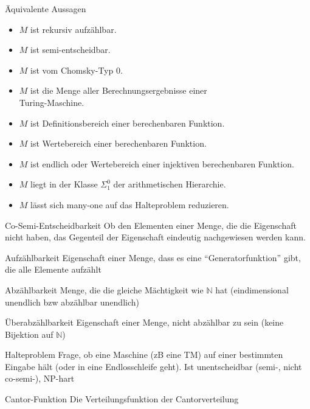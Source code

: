 \documentclass[a7paper,print,grid=both]{kartei}
\begin{document}
\begin{karte}{Äquivalente Aussagen}
\begin{itemize}
    \setlength{\itemindent}{-0.5cm}
    \setlength{\itemsep}{-0.1cm}
    \item $M$ ist rekursiv aufzählbar.
    \item $M$ ist semi-entscheidbar.
    \item $M$ ist vom Chomsky-Typ 0.
    \item $M$ ist die Menge aller Berechnungsergebnisse einer \\Turing-Maschine.
    \item $M$ ist Definitionsbereich einer berechenbaren Funktion.
    \item $M$ ist Wertebereich einer berechenbaren Funktion.
    \item $M$ ist endlich oder Wertebereich einer injektiven berechenbaren Funktion.
    \item $M$ liegt in der Klasse $\Sigma_1^0$ der arithmetischen Hierarchie.
    \item $M$ lässt sich many-one auf das Halteproblem reduzieren.
\end{itemize}
\end{karte}
\begin{karte}{Co-Semi-Entscheidbarkeit}
Ob den Elementen einer Menge, die die Eigenschaft nicht haben, das Gegenteil der Eigenschaft eindeutig nachgewiesen werden kann.
\end{karte}
\begin{karte}{Aufzählbarkeit}
Eigenschaft einer Menge, dass es eine ``Generatorfunktion'' gibt, die alle Elemente aufzählt
\end{karte}
\begin{karte}{Abzählbarkeit}
Menge, die die gleiche Mächtigkeit wie $\mathbb{N}$ hat (eindimensional unendlich bzw abzählbar unendlich)
\end{karte}
\begin{karte}{Überabzählbarkeit}
Eigenschaft einer Menge, nicht abzählbar zu sein (keine Bijektion auf $\mathbb{N}$)
\end{karte}
\begin{karte}{Halteproblem}
Frage, ob eine Maschine (zB eine TM) auf einer bestimmten Eingabe hält (oder in eine Endlosschleife geht). Ist unentscheidbar (semi-, nicht co-semi-), NP-hart
\end{karte}
\begin{karte}{Cantor-Funktion}
Die Verteilungsfunktion der Cantorverteilung
\end{karte}
\end{document}
